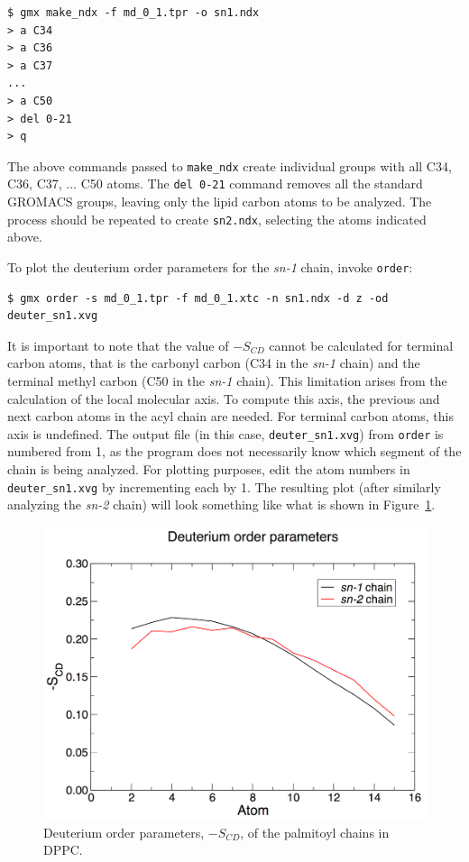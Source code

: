 \documentclass[9pt,tutorial,pubversion]{livecoms}
\begin{document}
\begin{lstlisting}
$ gmx make_ndx -f md_0_1.tpr -o sn1.ndx
> a C34
> a C36
> a C37
...
> a C50
> del 0-21
> q
\end{lstlisting}

The above commands passed to \texttt{make\_ndx} create individual groups with all C34, C36, C37, ... C50 atoms. The \texttt{del 0-21} command removes all the standard GROMACS groups, leaving only the lipid carbon atoms to be analyzed. The process should be repeated to create \texttt{sn2.ndx}, selecting the atoms indicated above.

To plot the deuterium order parameters for the {\em sn-1} chain, invoke \texttt{order}:

\begin{lstlisting}
$ gmx order -s md_0_1.tpr -f md_0_1.xtc -n sn1.ndx -d z -od deuter_sn1.xvg
\end{lstlisting}

It is important to note that the value of $-S_{CD}$ cannot be calculated for terminal carbon atoms, that is the carbonyl carbon (C34 in the {\em sn-1} chain) and the terminal methyl carbon (C50 in the {\em sn-1} chain). This limitation arises from the calculation of the local molecular axis. To compute this axis, the previous and next carbon atoms in the acyl chain are needed. For terminal carbon atoms, this axis is undefined. The output file (in this case, \texttt{deuter\_sn1.xvg}) from \texttt{order} is numbered from 1, as the program does not necessarily know which segment of the chain is being analyzed. For plotting purposes, edit the atom numbers in \texttt{deuter\_sn1.xvg} by incrementing each by 1. The resulting plot (after similarly analyzing the {\em sn-2} chain) will look something like what is shown in Figure~\ref{kalp_dppc_scd_fig}.

\begin{figure}[h!]
\centering
\includegraphics{plot_kalp_dppc_Scd}
\caption{Deuterium order parameters, $-S_{CD}$, of the palmitoyl chains in DPPC.}
\label{kalp_dppc_scd_fig}
\end{figure}
\end{document}
